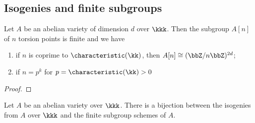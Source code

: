 \subsection{Isogenies and finite subgroups}

    \begin{theorem}\label{thm: torsion subgroups of abelian varieties}
        Let \(A\) be an abelian variety of dimension \(d\) over \(\kkk\). 
        Then the subgroup \(A[n]\) of \(n\) torsion points is finite and we have 
        \begin{enumerate}
            \item if \(n\) is coprime to \(\characteristic(\kk)\), then \(A[n] \cong (\bbZ/n\bbZ)^{2d}\);
            \item if \(n = p^k\) for \(p = \characteristic(\kk) > 0\)
        \end{enumerate}
    \end{theorem}
    \begin{proof}
    \end{proof}

    \begin{theorem}\label{thm:isogenies_and_finite_subgroups}
        Let \(A\) be an abelian variety over \(\kkk\). 
        There is a bijection between the isogenies from \(A\) over \(\kkk\) and the finite subgroup schemes of \(A\).
    \end{theorem}
